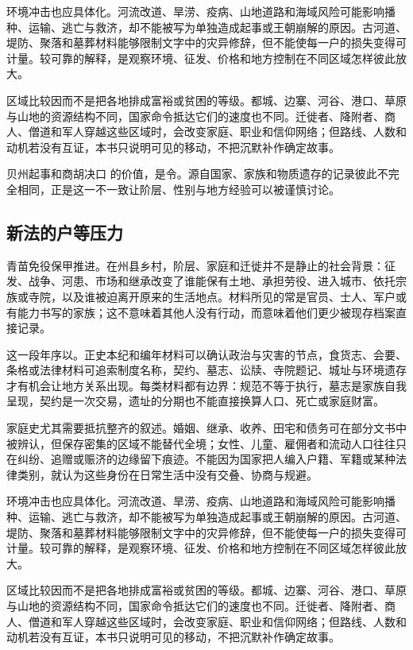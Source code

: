 环境冲击也应具体化。河流改道、旱涝、疫病、山地道路和海域风险可能影响播种、运输、逃亡与救济，却不能被写为单独造成起事或王朝崩解的原因。古河道、堤防、聚落和墓葬材料能够限制文字中的灾异修辞，但不能使每一户的损失变得可计量。较可靠的解释，是观察环境、征发、价格和地方控制在不同区域怎样彼此放大。

区域比较因而不是把各地排成富裕或贫困的等级。都城、边寨、河谷、港口、草原与山地的资源结构不同，国家命令抵达它们的速度也不同。迁徙者、降附者、商人、僧道和军人穿越这些区域时，会改变家庭、职业和信仰网络；但路线、人数和动机若没有互证，本书只说明可见的移动，不把沉默补作确定故事。

贝州起事和商胡决口 的价值，是令。源自国家、家族和物质遗存的记录彼此不完全相同，正是这一不一致让阶层、性别与地方经验可以被谨慎讨论。

\subsection{新法的户等压力}

青苗免役保甲推进。在州县乡村，阶层、家庭和迁徙并不是静止的社会背景：征发、战争、河患、市场和继承改变了谁能保有土地、承担劳役、进入城市、依托宗族或寺院，以及谁被迫离开原来的生活地点。材料所见的常是官员、士人、军户或有能力书写的家族；这不意味着其他人没有行动，而意味着他们更少被现存档案直接记录。

这一段年序以。正史本纪和编年材料可以确认政治与灾害的节点，食货志、会要、条格或法律材料可追索制度名称，契约、墓志、讼牍、寺院题记、城址与环境遗存才有机会让地方关系出现。每类材料都有边界：规范不等于执行，墓志是家族自我呈现，契约是一次交易，遗址的分期也不能直接换算人口、死亡或家庭财富。

家庭史尤其需要抵抗整齐的叙述。婚姻、继承、收养、田宅和债务可在部分文书中被辨认，但保存密集的区域不能替代全境；女性、儿童、雇佣者和流动人口往往只在纠纷、追赠或赈济的边缘留下痕迹。不能因为国家把人编入户籍、军籍或某种法律类别，就认为这些身份在日常生活中没有交叠、协商与规避。

环境冲击也应具体化。河流改道、旱涝、疫病、山地道路和海域风险可能影响播种、运输、逃亡与救济，却不能被写为单独造成起事或王朝崩解的原因。古河道、堤防、聚落和墓葬材料能够限制文字中的灾异修辞，但不能使每一户的损失变得可计量。较可靠的解释，是观察环境、征发、价格和地方控制在不同区域怎样彼此放大。

区域比较因而不是把各地排成富裕或贫困的等级。都城、边寨、河谷、港口、草原与山地的资源结构不同，国家命令抵达它们的速度也不同。迁徙者、降附者、商人、僧道和军人穿越这些区域时，会改变家庭、职业和信仰网络；但路线、人数和动机若没有互证，本书只说明可见的移动，不把沉默补作确定故事。

